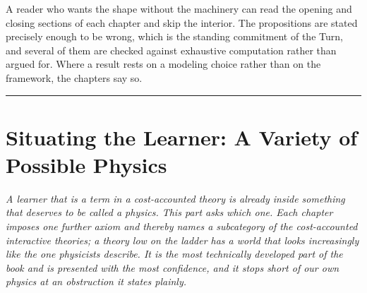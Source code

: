 \documentclass[12pt,openright,twoside]{book}
\theoremstyle{remark}
\theoremstyle{plain}
\theoremstyle{remark}
\theoremstyle{plain}
\theoremstyle{plain}
\begin{document}
A reader who wants the shape without the machinery can read the opening and
closing sections of each chapter and skip the interior.
The propositions are stated precisely enough to be wrong, which is the
standing commitment of the Turn, and several of them are checked against
exhaustive computation rather than argued for.
Where a result rests on a modeling choice rather than on the framework, the
chapters say so.

\bigskip
\noindent\hrule
\bigskip


\part{Situating the Learner: A Variety of Possible Physics}
\label{part:physics}

\vspace{1em}
\begin{mdframed}[backgroundcolor=remarkgray, linecolor=gray!60,
                 linewidth=1pt, topline=false, rightline=false,
                 bottomline=false]
\small\itshape
A learner that is a term in a cost-accounted theory is already inside
something that deserves to be called a physics.
This part asks which one.
Each chapter imposes one further axiom and thereby names a subcategory of
the cost-accounted interactive theories; a theory low on the ladder has a
world that looks increasingly like the one physicists describe.
It is the most technically developed part of the book and is presented
with the most confidence, and it stops short of our own physics at an
obstruction it states plainly.
\end{mdframed}

\bigskip

\end{document}
